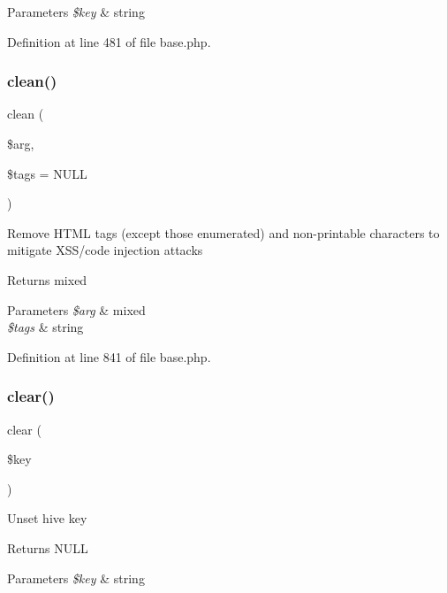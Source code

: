 \begin{DoxyParams}{Parameters}
{\em \$key} & string \\
\hline
\end{DoxyParams}


Definition at line 481 of file base.\+php.

\hypertarget{class_base_aaaeb3a6da8c7c370705a33e599c3144a}{}\label{class_base_aaaeb3a6da8c7c370705a33e599c3144a} 
\subsubsection{\texorpdfstring{clean()}{clean()}}
{\footnotesize\ttfamily clean (\begin{DoxyParamCaption}\item[{}]{\$arg,  }\item[{}]{\$tags = {\ttfamily NULL} }\end{DoxyParamCaption})}

Remove H\+T\+ML tags (except those enumerated) and non-\/printable characters to mitigate X\+S\+S/code injection attacks \begin{DoxyReturn}{Returns}
mixed 
\end{DoxyReturn}

\begin{DoxyParams}{Parameters}
{\em \$arg} & mixed \\
\hline
{\em \$tags} & string \\
\hline
\end{DoxyParams}


Definition at line 841 of file base.\+php.

\hypertarget{class_base_a10a949ef75de6c82c98ac555f371ba83}{}\label{class_base_a10a949ef75de6c82c98ac555f371ba83} 
\subsubsection{\texorpdfstring{clear()}{clear()}}
{\footnotesize\ttfamily clear (\begin{DoxyParamCaption}\item[{}]{\$key }\end{DoxyParamCaption})}

Unset hive key \begin{DoxyReturn}{Returns}
N\+U\+LL 
\end{DoxyReturn}

\begin{DoxyParams}{Parameters}
{\em \$key} & string \\
\hline
\end{DoxyParams}



